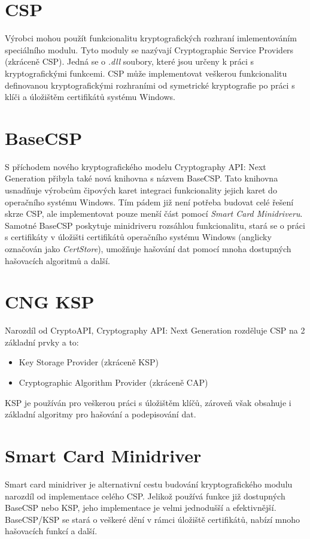 \documentclass[]{fithesis3}
\begin{document}
	\section{CSP}
	
	Výrobci mohou použít funkcionalitu kryptografických rozhraní imlementováním speciálního 			modulu. Tyto moduly se nazývají Cryptographic Service Providers (zkráceně CSP). Jedná se o 		\textit{.dll} soubory, které jsou určeny k práci s kryptografickými funkcemi. CSP může 				implementovat veškerou funkcionalitu definovanou kryptografickými rozhraními od symetrické 		kryptografie po práci s klíči a úložištěm certifikátů systému Windows.

	\section{BaseCSP}
	S příchodem nového kryptografického modelu Cryptography API: Next Generation přibyla také 		nová knihovna s názvem BaseCSP. Tato knihovna usnadňuje výrobcům čipových karet integraci 		funkcionality jejich karet do operačního systému Windows. Tím pádem již není potřeba budovat 		celé řešení skrze CSP, ale implementovat pouze menší část pomocí \textit{Smart Card 			Minidriveru}. Samotné BaseCSP poskytuje minidriveru rozsáhlou funkcionalitu, stará se o práci s 		certifikáty v úložišti certifikátů operačního systému Windows (anglicky označován jako 				\textit{CertStore}), umožňuje hašování dat pomocí mnoha dostupných hašovacích algoritmů a 		další.

	\section{CNG KSP}
	Narozdíl od CryptoAPI, Cryptography API: Next Generation rozděluje CSP na 2 základní prvky a 	to:
	\begin{itemize}
	\item Key Storage Provider (zkráceně KSP)
	\item Cryptographic Algorithm Provider (zkráceně CAP)
	\end{itemize}
	KSP je používán pro veškerou práci s úložištěm klíčů, zároveň však obsahuje i základní 				algoritmy pro hašování a podepisování dat.

	\section{Smart Card Minidriver}
	Smart card minidriver je alternativní cestu budování kryptografického modulu narozdíl od 			implementace celého CSP. Jelikož používá funkce již dostupných BaseCSP nebo KSP, jeho 			implementace je velmi jednodušší a efektivnější. BaseCSP/KSP se stará o veškeré dění v rámci 		úložiště certifikátů, nabízí mnoho hašovacích funkcí a další.  \newline
\end{document}
